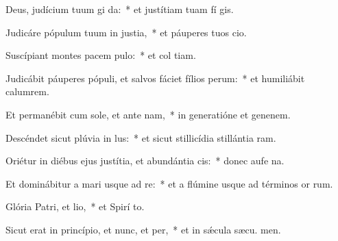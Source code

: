 \item Deus, judícium tuum gi da:~* et justítiam tuam fí gis.
\item Judicáre pópulum tuum in justia,~* et páuperes tuos  cio.
\item Suscípiant montes pacem pulo:~* et col tiam.
\item Judicábit páuperes pópuli, et salvos fáciet fílios perum:~* et humiliábit calumrem.
\item Et permanébit cum sole, et ante nam,~* in generatióne et genenem.
\item Descéndet sicut plúvia in lus:~* et sicut stillicídia stillántia  ram.
\item Oriétur in diébus ejus justítia, et abundántia cis:~* donec aufe na.
\item Et dominábitur a mari usque ad re:~* et a flúmine usque ad términos or rum.
\item Glória Patri, et lio,~* et Spirí to.
\item Sicut erat in princípio, et nunc, et per,~* et in sǽcula sæcu. men.
